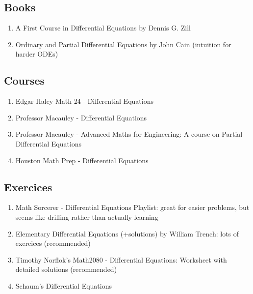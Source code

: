 \documentclass{article}
\begin{document}
\subsection{Books}%
\label{sub:Books}

\begin{enumerate}
    \item A First Course in Differential Equations by Dennis G. Zill
    \item Ordinary and Partial Differential Equations by John Cain (intuition for harder ODEs)
\end{enumerate}

\subsection{Courses}%
\label{sub:Courses}

\begin{enumerate}
    \item Edgar Haley Math 24 - Differential Equations
    \item Professor Macauley - Differential Equations
    \item Professor Macauley - Advanced Maths for Engineering: A course
	on Partial Differential Equations
    \item Houston Math Prep - Differential Equations
\end{enumerate}

\subsection{Exercices}%
\label{sub:Exercices}

\begin{enumerate}
    \item Math Sorcerer - Differential Equations Playlist: great for easier
	problems, but seems like drilling rather than actually learning
    \item Elementary Differential Equations (+solutions) by William Trench:
	lots of exercices (recommended)
    \item Timothy Norflok's Math2080 - Differential Equations: Worksheet
	with detailed solutions (recommended)
    \item Schaum's Differential Equations
\end{enumerate}

\pagebreak
\end{document}
